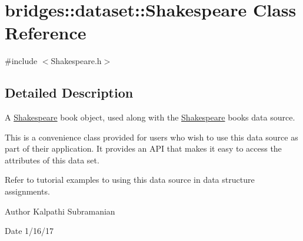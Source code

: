 \hypertarget{classbridges_1_1dataset_1_1_shakespeare}{}\section{bridges\+::dataset\+::Shakespeare Class Reference}
\label{classbridges_1_1dataset_1_1_shakespeare}


{\ttfamily \#include $<$Shakespeare.\+h$>$}



\subsection{Detailed Description}
A \mbox{\hyperlink{classbridges_1_1dataset_1_1_shakespeare}{Shakespeare}} book object, used along with the \mbox{\hyperlink{classbridges_1_1dataset_1_1_shakespeare}{Shakespeare}} books data source. 

This is a convenience class provided for users who wish to use this data source as part of their application. It provides an A\+PI that makes it easy to access the attributes of this data set.

Refer to tutorial examples to using this data source in data structure assignments.

\begin{DoxyAuthor}{Author}
Kalpathi Subramanian 
\end{DoxyAuthor}
\begin{DoxyDate}{Date}
1/16/17 
\end{DoxyDate}
